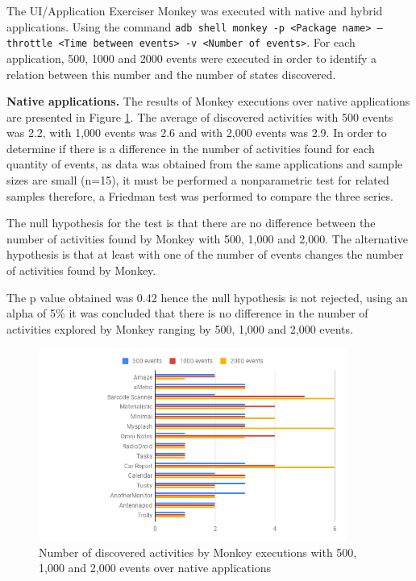 The UI/Application Exerciser Monkey was executed with native and hybrid applications. Using the command \texttt{adb shell monkey -p <Package name> --throttle <Time between events> -v <Number of events>}. For each application, 500, 1000 and 2000 events were executed in order to identify a relation between this number and the number of states discovered.

\textbf{Native applications.} The results of Monkey executions over native applications are presented in Figure \ref{monkeyNative}. The average of discovered activities with 500 events was 2.2, with 1,000 events was 2.6 and with 2,000 events was 2.9. In order to determine if there is a difference in the number of activities found for each quantity of events, as data was obtained from the same applications and sample sizes are small (n=15), it must be performed a nonparametric test for related samples therefore, a Friedman test was performed to compare the three series.

The null hypothesis for the test is that there are no difference between the number of activities found by Monkey with 500, 1,000 and 2,000. The alternative hypothesis is that at least with one of the number of events changes the number of activities found by Monkey.

The p value obtained was 0.42 hence the null hypothesis is not rejected,  using an alpha of 5\% it was concluded that there is no difference in the number of activities explored by Monkey ranging by 500, 1,000 and 2,000 events.
\begin{figure}[t]
	\centering
	\includegraphics[width=0.9\textwidth]{img/monkeyNative.png}
	\caption{Number of discovered activities by Monkey executions with 500, 1,000 and 2,000 events over native applications}
	
	\label{monkeyNative}
\end{figure} 

